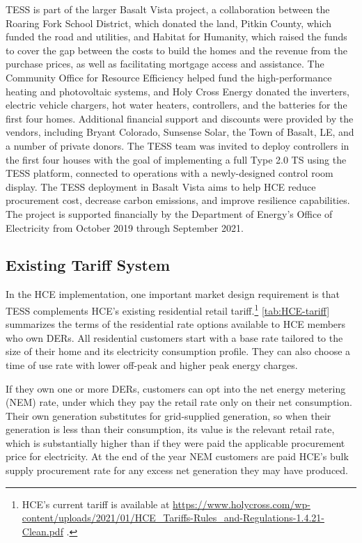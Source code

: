 TESS is part of the larger Basalt Vista project, a collaboration between the Roaring Fork School District, which donated the land, Pitkin County, which funded the road and utilities, and Habitat for Humanity, which raised the funds to cover the gap between the costs to build the homes and the revenue from the purchase prices, as well as facilitating mortgage access and assistance.  The Community Office for Resource Efficiency helped fund the high-performance heating and photovoltaic systems, and Holy Cross Energy donated the inverters, electric vehicle chargers, hot water heaters, controllers, and the batteries for the first four homes.  Additional financial support and discounts were provided by the vendors, including Bryant Colorado, Sunsense Solar, the Town of Basalt, LE, and a number of private donors. The TESS team was invited to deploy controllers in the first four houses with the goal of implementing a full Type 2.0 TS using the TESS platform, connected to operations with a newly-designed control room display. The TESS deployment in Basalt Vista aims to help HCE reduce procurement cost, decrease carbon emissions, and improve resilience capabilities. The project is supported financially by the Department of Energy's Office of Electricity from October 2019 through September 2021.

\subsection{Existing Tariff System}\label{sec:HCE_tariff}

In the HCE implementation, one important market design requirement is that TESS complements HCE's existing residential retail tariff.\footnote{HCE's current tariff is available at \url{https://www.holycross.com/wp-content/uploads/2021/01/HCE_Tariffs-Rules_and-Regulations-1.4.21-Clean.pdf} \citep{holy_cross_energy_electric_2020}.}
\cref{tab:HCE-tariff} summarizes the terms of the residential rate options available to HCE members who own DERs. All residential customers start with a base rate tailored to the size of their home and its electricity consumption profile. They can also choose a time of use rate with lower off-peak and higher peak energy charges. 

If they own one or more DERs, customers can opt into the net energy metering (NEM) rate, under which they pay the retail rate only on their net consumption. Their own generation substitutes for grid-supplied generation, so when their generation is less than their consumption, its value is the relevant retail rate, which is substantially higher than if they were paid the applicable procurement price for electricity. At the end of the year NEM customers are paid HCE's bulk supply procurement rate for any excess net generation they may have produced.


